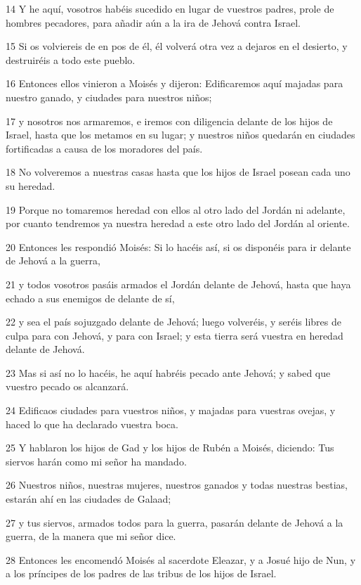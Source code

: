 \par 14 Y he aquí, vosotros habéis sucedido en lugar de vuestros padres, prole de hombres pecadores, para añadir aún a la ira de Jehová contra Israel.
\par 15 Si os volviereis de en pos de él, él volverá otra vez a dejaros en el desierto, y destruiréis a todo este pueblo.
\par 16 Entonces ellos vinieron a Moisés y dijeron: Edificaremos aquí majadas para nuestro ganado, y ciudades para nuestros niños;
\par 17 y nosotros nos armaremos, e iremos con diligencia delante de los hijos de Israel, hasta que los metamos en su lugar; y nuestros niños quedarán en ciudades fortificadas a causa de los moradores del país.
\par 18 No volveremos a nuestras casas hasta que los hijos de Israel posean cada uno su heredad.
\par 19 Porque no tomaremos heredad con ellos al otro lado del Jordán ni adelante, por cuanto tendremos ya nuestra heredad a este otro lado del Jordán al oriente.
\par 20 Entonces les respondió Moisés: Si lo hacéis así, si os disponéis para ir delante de Jehová a la guerra,
\par 21 y todos vosotros pasáis armados el Jordán delante de Jehová, hasta que haya echado a sus enemigos de delante de sí,
\par 22 y sea el país sojuzgado delante de Jehová; luego volveréis, y seréis libres de culpa para con Jehová, y para con Israel; y esta tierra será vuestra en heredad delante de Jehová.
\par 23 Mas si así no lo hacéis, he aquí habréis pecado ante Jehová; y sabed que vuestro pecado os alcanzará.
\par 24 Edificaos ciudades para vuestros niños, y majadas para vuestras ovejas, y haced lo que ha declarado vuestra boca.
\par 25 Y hablaron los hijos de Gad y los hijos de Rubén a Moisés, diciendo: Tus siervos harán como mi señor ha mandado.
\par 26 Nuestros niños, nuestras mujeres, nuestros ganados y todas nuestras bestias, estarán ahí en las ciudades de Galaad;
\par 27 y tus siervos, armados todos para la guerra, pasarán delante de Jehová a la guerra, de la manera que mi señor dice.
\par 28 Entonces les encomendó Moisés al sacerdote Eleazar, y a Josué hijo de Nun, y a los príncipes de los padres de las tribus de los hijos de Israel.
